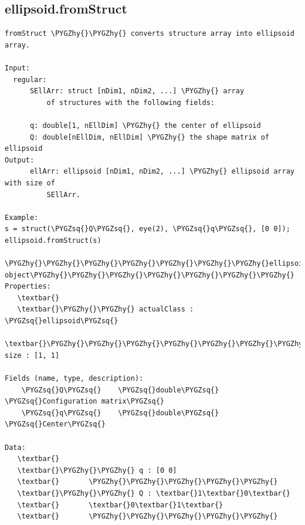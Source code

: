 \documentclass[letterpaper,10pt,english]{sphinxmanual}
\def\PYGZhy{\char`\-}
\def\PYGZsq{\char`\'}
\begin{document}
\subsection{ellipsoid.fromStruct}
\label{chap_functions:ellipsoid-fromstruct}
\begin{Verbatim}[commandchars=\\\{\}]
fromStruct \PYGZhy{}\PYGZhy{} converts structure array into ellipsoid array.

Input:
  regular:
      SEllArr: struct [nDim1, nDim2, ...] \PYGZhy{} array
          of structures with the following fields:

      q: double[1, nEllDim] \PYGZhy{} the center of ellipsoid
      Q: double[nEllDim, nEllDim] \PYGZhy{} the shape matrix of ellipsoid
Output:
      ellArr: ellipsoid [nDim1, nDim2, ...] \PYGZhy{} ellipsoid array with size of
          SEllArr.

Example:
s = struct(\PYGZsq{}Q\PYGZsq{}, eye(2), \PYGZsq{}q\PYGZsq{}, [0 0]);
ellipsoid.fromStruct(s)

\PYGZhy{}\PYGZhy{}\PYGZhy{}\PYGZhy{}\PYGZhy{}\PYGZhy{}\PYGZhy{}ellipsoid object\PYGZhy{}\PYGZhy{}\PYGZhy{}\PYGZhy{}\PYGZhy{}\PYGZhy{}\PYGZhy{}
Properties:
   \textbar{}
   \textbar{}\PYGZhy{}\PYGZhy{} actualClass : \PYGZsq{}ellipsoid\PYGZsq{}
   \textbar{}\PYGZhy{}\PYGZhy{}\PYGZhy{}\PYGZhy{}\PYGZhy{}\PYGZhy{}\PYGZhy{}\PYGZhy{}\PYGZhy{} size : [1, 1]

Fields (name, type, description):
    \PYGZsq{}Q\PYGZsq{}    \PYGZsq{}double\PYGZsq{}    \PYGZsq{}Configuration matrix\PYGZsq{}
    \PYGZsq{}q\PYGZsq{}    \PYGZsq{}double\PYGZsq{}    \PYGZsq{}Center\PYGZsq{}

Data:
   \textbar{}
   \textbar{}\PYGZhy{}\PYGZhy{} q : [0 0]
   \textbar{}       \PYGZhy{}\PYGZhy{}\PYGZhy{}\PYGZhy{}\PYGZhy{}
   \textbar{}\PYGZhy{}\PYGZhy{} Q : \textbar{}1\textbar{}0\textbar{}
   \textbar{}       \textbar{}0\textbar{}1\textbar{}
   \textbar{}       \PYGZhy{}\PYGZhy{}\PYGZhy{}\PYGZhy{}\PYGZhy{}
\end{Verbatim}
\end{document}
